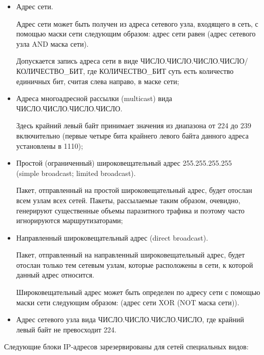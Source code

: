 	\begin{itemize}

		\item Адрес сети.

			Адрес сети может быть получен из адреса сетевого узла, входящего в сеть, с помощью маски сети следующим образом: адрес сети равен
			(адрес сетевого узла AND маска сети).

			Допускается запись адреса сети в виде ЧИСЛО.ЧИСЛО.ЧИСЛО.ЧИ\-СЛО/КО\-ЛИ\-ЧЕ\-СТВО\_БИТ, где КОЛИЧЕСТВО\_БИТ суть есть количество единичных бит,
			считая слева направо, в маске сети;

		\item Адреса многоадресной рассылки (multicast) вида ЧИСЛО.ЧИСЛО.ЧИСЛО.ЧИ\-СЛО.

			Здесь крайний левый байт принимает значения из диапазона от 224 до 239 включительно (первые четыре бита крайнего левого байта данного адреса
			установлены в 1110);

		\item Простой (ограниченный) широковещательный адрес 255.255.255.255\\(simple broadcast; limited broadcast).

			Пакет, отправленный на простой широковещательный адрес, будет отослан всем узлам всех сетей. Пакеты, рассылаемые таким образом,
			очевидно, генерируют существенные объемы паразитного трафика и поэтому часто игнорируются маршрутизаторами;

		\item Направленный широковещательный адрес (direct broadcast).

			Пакет, отправленный на направленный широковещательный адрес, будет отослан только тем сетевым узлам,
			которые расположены в сети, к которой данный адрес относится.

			Широковещательный адрес может быть определен по адресу сети с помощью маски сети следующим образом: (адрес сети XOR (NOT маска сети)).

		\item Адрес сетевого узла вида ЧИСЛО.ЧИСЛО.ЧИСЛО.ЧИСЛО, где крайний левый байт не превосходит 224.

	\end{itemize}

	Следующие блоки IP-адресов зарезервированы для сетей специальных видов:

